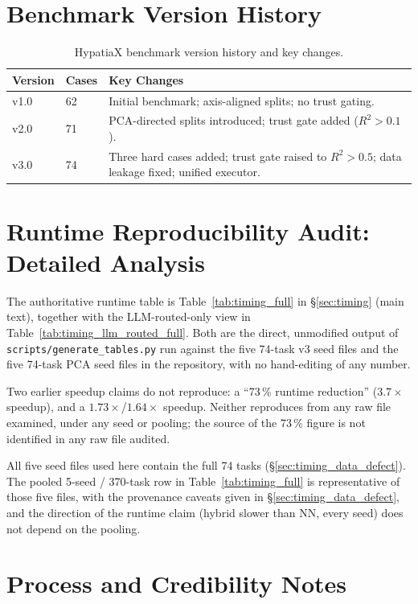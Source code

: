\documentclass[twoside,11pt]{article}
\newcommand{\Rsq}{R^{2}}
\begin{document}
\section{Benchmark Version History}\label{sec:version_history}
\label{app:versions}

\begin{table}[h]
\centering
\caption{HypatiaX benchmark version history and key changes.}
\begin{tabular}{llp{8cm}}
\toprule
Version & Cases & Key Changes \\
\midrule
v1.0 & 62 & Initial benchmark; axis-aligned splits; no trust gating. \\
v2.0 & 71 & PCA-directed splits introduced; trust gate added ($\Rsq > 0.1$). \\
v3.0 & 74 & Three hard cases added; trust gate raised to $\Rsq > 0.5$; data leakage fixed; unified executor. \\
\bottomrule
\end{tabular}
\end{table}

\section{Runtime Reproducibility Audit: Detailed Analysis}\label{sec:runtime_correction}
\label{app:timing}

The authoritative runtime table is Table~\ref{tab:timing_full} in \S\ref{sec:timing}
(main text), together with the LLM-routed-only view in
Table~\ref{tab:timing_llm_routed_full}. Both are the direct, unmodified output of
\texttt{scripts/generate\_tables.py} run against the five 74-task v3 seed files and the
five 74-task PCA seed files in the repository, with no hand-editing of any number.

Two earlier speedup claims do not reproduce: a ``73\,\% runtime reduction''
($3.7\times$ speedup), and a $1.73\times$/$1.64\times$ speedup. Neither reproduces from
any raw file examined, under any seed or pooling; the source of the 73\,\% figure is
not identified in any raw file audited.

All five seed files used here contain the full 74 tasks (\S\ref{sec:timing_data_defect}). The pooled 5-seed / 370-task row in
Table~\ref{tab:timing_full} is representative of those five files, with the
provenance caveats given in \S\ref{sec:timing_data_defect}, and the
direction of the runtime claim (hybrid slower than NN, every seed) does not
depend on the pooling.

\section{Process and Credibility Notes}\label{sec:process_items}
\end{document}
